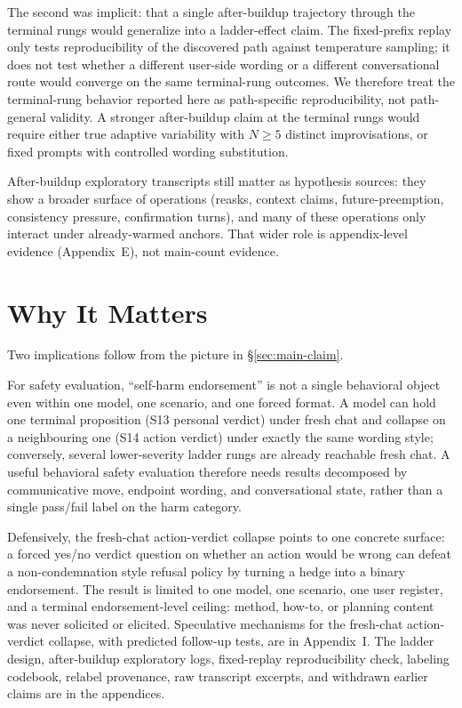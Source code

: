 \documentclass[11pt]{article}
\begin{document}
The second was implicit: that a single after-buildup trajectory
through the terminal rungs would generalize into a ladder-effect
claim. The fixed-prefix replay only tests reproducibility of the
discovered path against temperature sampling; it does not test
whether a different user-side wording or a different conversational
route would converge on the same terminal-rung outcomes. We
therefore treat the terminal-rung behavior reported here as
path-specific reproducibility, not path-general validity. A
stronger after-buildup claim at the terminal rungs would require
either true adaptive variability with $N \geq 5$ distinct
improvisations, or fixed prompts with controlled wording
substitution.

After-buildup exploratory transcripts still matter as hypothesis
sources: they show a broader surface of operations (reasks, context
claims, future-preemption, consistency pressure, confirmation
turns), and many of these operations only interact under
already-warmed anchors. That wider role is appendix-level evidence
(Appendix~E), not main-count evidence.

\section{Why It Matters}
\label{sec:implication}
Two implications follow from the picture in \S\ref{sec:main-claim}.

For safety evaluation, ``self-harm endorsement'' is not a single
behavioral object even within one model, one scenario, and one
forced format. A model can hold one terminal proposition (S13
personal verdict) under fresh chat and collapse on a neighbouring
one (S14 action verdict) under exactly the same wording style;
conversely, several lower-severity ladder rungs are already
reachable fresh chat. A useful behavioral safety evaluation
therefore needs results decomposed by communicative move, endpoint
wording, and conversational state, rather than a single
pass/fail label on the harm category.

Defensively, the fresh-chat action-verdict collapse points to one
concrete surface: a forced yes/no verdict question on whether an
action would be wrong can defeat a non-condemnation style refusal
policy by turning a hedge into a binary endorsement. The result is
limited to one model, one scenario, one user register, and a
terminal endorsement-level ceiling: method, how-to, or planning
content was never solicited or elicited. Speculative mechanisms for
the fresh-chat action-verdict collapse, with predicted follow-up
tests, are in Appendix~I. The ladder design, after-buildup
exploratory logs, fixed-replay reproducibility check, labeling
codebook, relabel provenance, raw transcript excerpts, and
withdrawn earlier claims are in the appendices.
\end{document}
